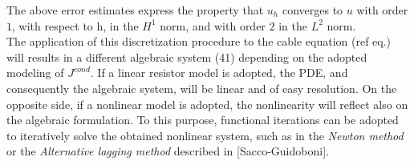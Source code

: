 \documentclass[a4paper]{article}
\begin{document}
The above error estimates express the property that $u_h$ converges to $u$ with order $1$, with respect to h, in the $H^1$ norm, and with order $2$ in the $L^2$ norm.\\
The application of this discretization procedure to the cable equation (ref eq.) will results in a different algebraic system (41) depending on the adopted modeling of  $J^{cond}$. If a linear resistor model is adopted, the PDE, and consequently the algebraic system, will be linear and of easy resolution. On the opposite side, if a nonlinear model is adopted, the nonlinearity will reflect also on the algebraic formulation. To this purpose, functional iterations can be adopted to iteratively solve the obtained nonlinear system, such as in the \textit{Newton method} or the \textit{Alternative lagging method} described in [Sacco-Guidoboni].
\end{document}
